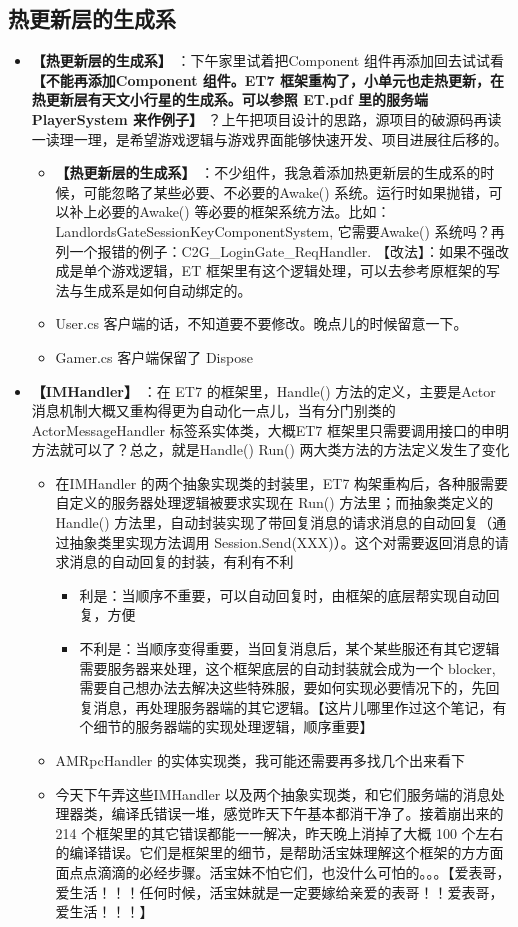 \documentclass[9pt, b5paper]{article}
\begin{document}
\subsection{热更新层的生成系}
\label{sec:orgcafbafb}
\begin{itemize}
\item \textbf{【热更新层的生成系】} ：下午家里试着把Component 组件再添加回去试试看 \textbf{【不能再添加Component 组件。ET7 框架重构了，小单元也走热更新，在热更新层有天文小行星的生成系。可以参照 ET.pdf 里的服务端 PlayerSystem 来作例子】} ？上午把项目设计的思路，源项目的破源码再读一读理一理，是希望游戏逻辑与游戏界面能够快速开发、项目进展往后移的。
\begin{itemize}
\item \textbf{【热更新层的生成系】} ：不少组件，我急着添加热更新层的生成系的时候，可能忽略了某些必要、不必要的Awake() 系统。运行时如果抛错，可以补上必要的Awake() 等必要的框架系统方法。比如：LandlordsGateSessionKeyComponentSystem, 它需要Awake() 系统吗？再列一个报错的例子：C2G\_LoginGate\_ReqHandler. 【改法】：如果不强改成是单个游戏逻辑，ET 框架里有这个逻辑处理，可以去参考原框架的写法与生成系是如何自动绑定的。
\item User.cs 客户端的话，不知道要不要修改。晚点儿的时候留意一下。
\item Gamer.cs 客户端保留了 Dispose
\end{itemize}
\item \textbf{【IMHandler】} ：在 ET7 的框架里，Handle() 方法的定义，主要是Actor 消息机制大概又重构得更为自动化一点儿，当有分门别类的ActorMessageHandler 标签系实体类，大概ET7 框架里只需要调用接口的申明方法就可以了？总之，就是Handle() Run() 两大类方法的方法定义发生了变化
\begin{itemize}
\item 在IMHandler 的两个抽象实现类的封装里，ET7 构架重构后，各种服需要自定义的服务器处理逻辑被要求实现在 Run() 方法里；而抽象类定义的Handle() 方法里，自动封装实现了带回复消息的请求消息的自动回复（通过抽象类里实现方法调用 Session.Send(XXX)）。这个对需要返回消息的请求消息的自动回复的封装，有利有不利
\begin{itemize}
\item 利是：当顺序不重要，可以自动回复时，由框架的底层帮实现自动回复，方便
\item 不利是：当顺序变得重要，当回复消息后，某个某些服还有其它逻辑需要服务器来处理，这个框架底层的自动封装就会成为一个 blocker, 需要自己想办法去解决这些特殊服，要如何实现必要情况下的，先回复消息，再处理服务器端的其它逻辑。【这片儿哪里作过这个笔记，有个细节的服务器端的实现处理逻辑，顺序重要】
\end{itemize}
\item AMRpcHandler 的实体实现类，我可能还需要再多找几个出来看下
\item 今天下午弄这些IMHandler 以及两个抽象实现类，和它们服务端的消息处理器类，编译氏错误一堆，感觉昨天下午基本都消干净了。接着崩出来的 214 个框架里的其它错误都能一一解决，昨天晚上消掉了大概 100 个左右的编译错误。它们是框架里的细节，是帮助活宝妹理解这个框架的方方面面点点滴滴的必经步骤。活宝妹不怕它们，也没什么可怕的。。。【爱表哥，爱生活！！！任何时候，活宝妹就是一定要嫁给亲爱的表哥！！爱表哥，爱生活！！！】
\end{itemize}
\end{itemize}
\end{document}
